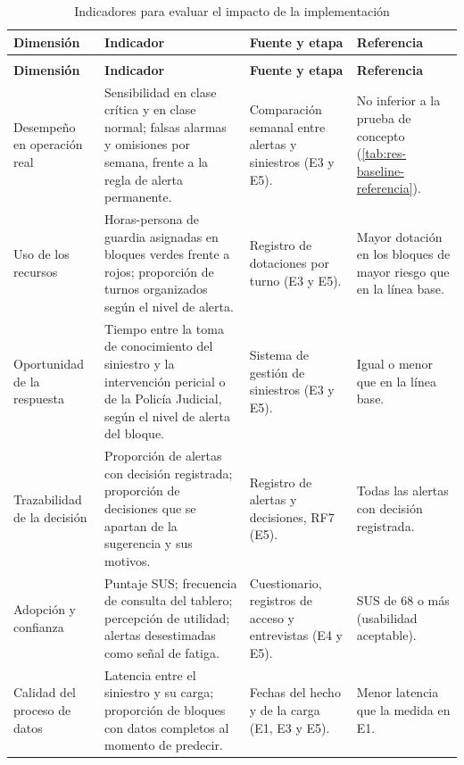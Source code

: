 {\small
\begin{longtable}{@{}>{\raggedright\arraybackslash}p{}
                    >{\raggedright\arraybackslash}p{}
                    >{\raggedright\arraybackslash}p{}
                    >{\raggedright\arraybackslash}p{}@{}}
\caption{Indicadores para evaluar el impacto de la implementación}
\label{tab:impl-indicadores} \\
\toprule
\textbf{Dimensión} & \textbf{Indicador} & \textbf{Fuente y etapa} & \textbf{Referencia} \\
\midrule
\endfirsthead
\multicolumn{4}{@{}l}{\footnotesize\textit{Tabla \ref{tab:impl-indicadores} (continuación)}} \\
\toprule
\textbf{Dimensión} & \textbf{Indicador} & \textbf{Fuente y etapa} & \textbf{Referencia} \\
\midrule
\endhead
\bottomrule
\endfoot
Desempeño en operación real
  & Sensibilidad en clase crítica y en clase normal; falsas alarmas y omisiones por
    semana, frente a la regla de alerta permanente.
  & Comparación semanal entre alertas y siniestros (E3 y E5).
  & No inferior a la prueba de concepto (\cref{tab:res-baseline-referencia}). \\
Uso de los recursos
  & Horas-persona de guardia asignadas en bloques verdes frente a rojos; proporción de
    turnos organizados según el nivel de alerta.
  & Registro de dotaciones por turno (E3 y E5).
  & Mayor dotación en los bloques de mayor riesgo que en la línea base. \\
Oportunidad de la respuesta
  & Tiempo entre la toma de conocimiento del siniestro y la intervención pericial o de
    la Policía Judicial, según el nivel de alerta del bloque.
  & Sistema de gestión de siniestros (E3 y E5).
  & Igual o menor que en la línea base. \\
Trazabilidad de la decisión
  & Proporción de alertas con decisión registrada; proporción de decisiones que se
    apartan de la sugerencia y sus motivos.
  & Registro de alertas y decisiones, RF7 (E5).
  & Todas las alertas con decisión registrada. \\
Adopción y confianza
  & Puntaje SUS; frecuencia de consulta del tablero; percepción de utilidad; alertas
    desestimadas como señal de fatiga.
  & Cuestionario, registros de acceso y entrevistas (E4 y E5).
  & SUS de 68 o más (usabilidad aceptable). \\
Calidad del proceso de datos
  & Latencia entre el siniestro y su carga; proporción de bloques con datos completos
    al momento de predecir.
  & Fechas del hecho y de la carga (E1, E3 y E5).
  & Menor latencia que la medida en E1. \\
\end{longtable}
}

